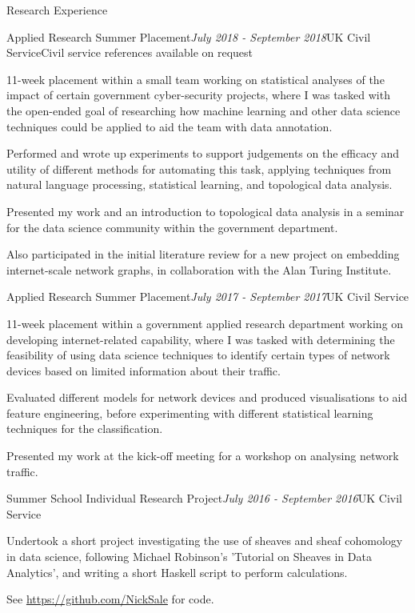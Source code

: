 \documentclass{resume} %
\begin{document}
\begin{rSection}{Research Experience}
	
\begin{rSubsection}{Applied Research Summer Placement}{\em July 2018 - September 2018}{UK Civil Service}{Civil service references available on request}
	\item 11-week placement within a small team working on statistical analyses of the impact of certain government cyber-security projects, where I was tasked with the open-ended goal of researching how machine learning and other data science techniques could be applied to aid the team with data annotation.
	\item Performed and wrote up experiments to support judgements on the efficacy and utility of different methods for automating this task, applying techniques from natural language processing, statistical learning, and topological data analysis.
	\item Presented my work and an introduction to topological data analysis in a seminar for the data science community within the government department.
	\item Also participated in the initial literature review for a new project on embedding internet-scale network graphs, in collaboration with the Alan Turing Institute.
\end{rSubsection}


\begin{rSubsection}{Applied Research Summer Placement}{\em July 2017 - September 2017}{UK Civil Service}{}
	\item 11-week placement within a government applied research department working on developing internet-related capability, where I was tasked with determining the feasibility of using data science techniques to identify certain types of network devices based on limited information about their traffic.
	\item Evaluated different models for network devices and produced visualisations to aid feature engineering, before experimenting with different statistical learning techniques for the classification.
	\item Presented my work at the kick-off meeting for a workshop on analysing network traffic.
\end{rSubsection}


\begin{rSubsection}{Summer School Individual Research Project}{\em July 2016 - September 2016}{UK Civil Service}{}
	\item Undertook a short project investigating the use of sheaves and sheaf cohomology in data science, following Michael Robinson's 'Tutorial on Sheaves in Data Analytics', and writing a short Haskell script to perform calculations.
	\item See \url{https://github.com/NickSale} for code.
\end{rSubsection}



\end{rSection}
\end{document}
